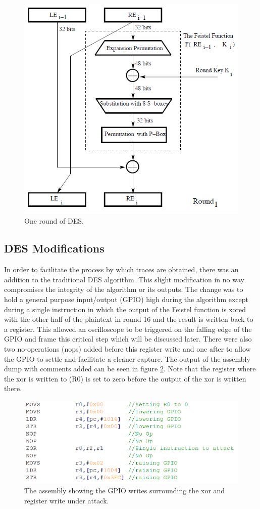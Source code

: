 	\begin{figure}[h]
	\centering
	\includegraphics[width=0.7\linewidth]{./round}
	\caption{One round of DES.}
	\label{fig:round}
	\end{figure}

\subsection{DES Modifications}
	In order to facilitate the process by which traces are obtained, there was an addition to the traditional DES algorithm.  This slight modification in no way compromises the integrity of the algorithm or its outputs.  The change was to hold a general purpose input/output (GPIO) high during the algorithm except during a single instruction in which the output of the Feistel function is xored with the other half of the plaintext in round 16 and the result is written back to a register.  This allowed an oscilloscope to be triggered on the falling edge of the GPIO and frame this critical step which will be discussed later.  There were also two no-operations (nops) added before this register write and one after to allow the GPIO to settle and facilitate a cleaner capture.  The output of the assembly dump with comments added can be seen in figure \ref{fig:asm_snippet}.  Note that the register where the xor is written to (R0) is set to zero before the output of the xor is written there.
	
	\begin{figure}[h]
	\centering
	\includegraphics[width=0.7\linewidth]{./asm_snippet}
	\caption{The assembly showing the GPIO writes surrounding the xor and register write under attack.}
	\label{fig:asm_snippet}
	\end{figure}

